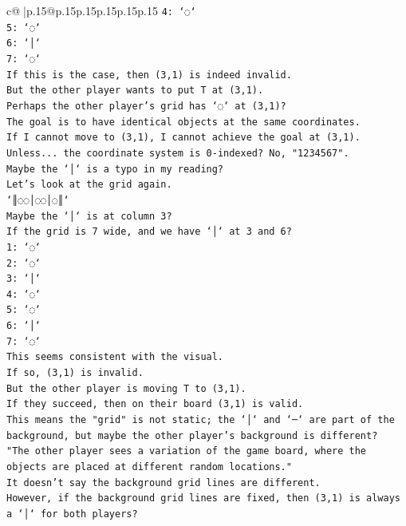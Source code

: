 \documentclass{article}
\begin{document}
{\begin{supertabular}{c@{$\;$}|p{.15\linewidth}@{}p{.15\linewidth}p{.15\linewidth}p{.15\linewidth}p{.15\linewidth}p{.15\linewidth}}
{{{\texttt{4: `◌`} \\
\texttt{5: `◌`} \\
\texttt{6: `│`} \\
\texttt{7: `◌`} \\
\texttt{If this is the case, then (3,1) is indeed invalid.} \\
\texttt{But the other player wants to put T at (3,1).} \\
\texttt{Perhaps the other player's grid has `◌` at (3,1)?} \\
\texttt{The goal is to have identical objects at the same coordinates.} \\
\texttt{If I cannot move to (3,1), I cannot achieve the goal at (3,1).} \\
\texttt{Unless... the coordinate system is 0{-}indexed? No, "1234567".} \\
\texttt{Maybe the `│` is a typo in my reading?} \\
\texttt{Let's look at the grid again.} \\
\texttt{`║◌◌│◌◌│◌║`} \\
\texttt{Maybe the `│` is at column 3?} \\
\texttt{If the grid is 7 wide, and we have `│` at 3 and 6?} \\
\texttt{1: `◌`} \\
\texttt{2: `◌`} \\
\texttt{3: `│`} \\
\texttt{4: `◌`} \\
\texttt{5: `◌`} \\
\texttt{6: `│`} \\
\texttt{7: `◌`} \\
\texttt{This seems consistent with the visual.} \\
\texttt{If so, (3,1) is invalid.} \\
\texttt{But the other player is moving T to (3,1).} \\
\texttt{If they succeed, then on their board (3,1) is valid.} \\
\texttt{This means the "grid" is not static; the `│` and `─` are part of the background, but maybe the other player's background is different?} \\
\texttt{"The other player sees a variation of the game board, where the objects are placed at different random locations."} \\
\texttt{It doesn't say the background grid lines are different.} \\
\texttt{However, if the background grid lines are fixed, then (3,1) is always a `│` for both players?} \\
}}}
\end{supertabular}}
\end{document}
